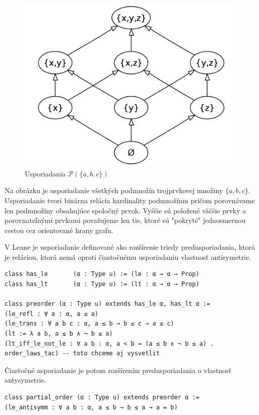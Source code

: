 \documentclass[a4paper,10pt,oneside]{report}%
\begin{document}
\begin{figure}[!ht]
    \centering
    \includegraphics[scale=0.15]{cube.png}
    \caption{Usporiadania $\mathcal{P}(\{a,b,c\})$}
\end{figure}

    Na obrázku je usporiadanie všetkých podmnožín trojprvkovej množiny $\{ a,b,c \}$.
    Usporiadanie tvorí binárna relácia kardinality podmnožínm pričom porovnávame
len podmnožiny obsahujúce spoločný prvok.
    Vyššie sú položené väčšie prvky a porovnateľnými prvkami považujeme len tie,
ktoré sú "pokryté" jednosmernou cestou cez orientované hrany grafu.

    V Leane je usporiadanie definované ako rozšírenie triedy predusporiadania, ktorá
je reláciou, ktorá nemá oproti čiastočnému usporiadaniu vlastnosť antisymetrie.

\begin{lstlisting}
class has_le       (α : Type u) := (le : α → α → Prop)
class has_lt       (α : Type u) := (lt : α → α → Prop)

class preorder (α : Type u) extends has_le α, has_lt α :=
(le_refl : ∀ a : α, a ≤ a)
(le_trans : ∀ a b c : α, a ≤ b → b ≤ c → a ≤ c)
(lt := λ a b, a ≤ b ∧ ¬ b ≤ a)
(lt_iff_le_not_le : ∀ a b : α, a < b ↔ (a ≤ b ∧ ¬ b ≤ a) . order_laws_tac) -- toto chceme aj vysvetlit
\end{lstlisting}
Čiastočné usporiadanie je potom rozšírením predusporiadania o vlastnosť antysymetrie.
\begin{lstlisting}
class partial_order (α : Type u) extends preorder α :=
(le_antisymm : ∀ a b : α, a ≤ b → b ≤ a → a = b)
\end{lstlisting}
\end{document}
